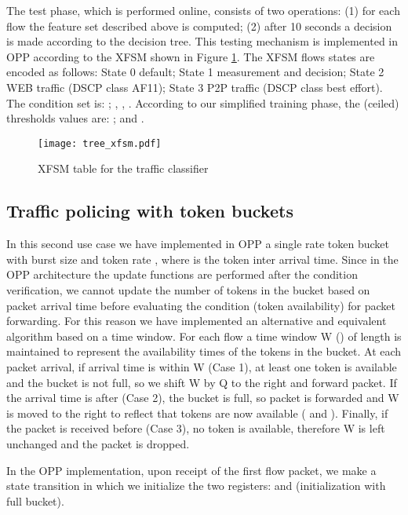 \documentclass{sig-alternate}
\begin{document}
The test phase, which is performed online, consists of two operations: (1) for each flow the feature set described above is computed; (2) after 10 seconds a decision is made according to the decision tree. This testing mechanism is implemented in OPP according to the XFSM shown in Figure \ref{fig:tree}. The XFSM flows states are encoded as follows: State 0  default; State 1  measurement and decision; State 2  WEB traffic (DSCP class AF11); State 3  P2P traffic (DSCP class best effort). The condition set is:  ;  , , . According to our simplified training phase, the (ceiled) thresholds  values are: ;  and . 

\begin{figure}[t]
   \centering
   \texttt{[image: tree\_xfsm.pdf]}            	  \vspace{-1em}

   \caption{XFSM table for the traffic classifier}
            	  \vspace{-1.5em}
   \label{fig:tree}
\end{figure}

\subsection{Traffic policing with token buckets}
In this second use case we have implemented in OPP a single rate token bucket with burst size  and token rate , where  is the token inter arrival time. Since in the OPP architecture the update functions are performed after the condition verification, we cannot update the number of tokens in the bucket based on packet arrival time before evaluating the condition (token availability) for packet forwarding. For this reason we have implemented an alternative and  equivalent algorithm based on a time window. For each flow a time window W () of length  is maintained to represent the availability times of the tokens in the bucket. At each packet arrival, if arrival time  is within W (Case 1), at least one token is available and the bucket is not full, so we shift W by Q to the right and forward packet. If the arrival time is after  (Case 2), the bucket is full, so packet is forwarded and W is moved to the right to reflect that  tokens are now available ( and ). Finally, if the packet is received before  (Case 3), no token is available, therefore W is left unchanged and the packet is dropped.

In the OPP implementation, upon receipt of the first flow packet, we make a state transition in which we initialize the two registers:  and  (initialization with full bucket). 
\end{document}

